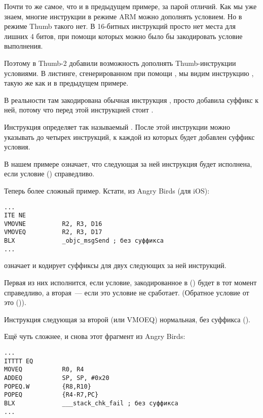 Почти то же самое, что и в предыдущем примере, за парой отличий.
Как мы уже знаем, многие инструкции в режиме ARM можно дополнять условием.
Но в режиме Thumb такого нет.
В 16-битных инструкций просто нет места для лишних 4 битов, при помощи
которых можно было бы закодировать условие выполнения.

Поэтому в Thumb-2 добавили возможность дополнять Thumb-инструкции условиями.
В листинге, сгенерированном при помощи \IDA, мы видим инструкцию , 
такую же как и в предыдущем примере.

В реальности там закодирована обычная инструкция , просто \IDA добавила суффикс  к ней, 
потому что перед этой инструкцией стоит .

\label{ARM_Thumb_IT}
Инструкция  определяет так называемый . 
После этой инструкции можно указывать до четырех инструкций, 
к каждой из которых будет добавлен суффикс условия.

В нашем примере  означает,
что следующая за ней инструкция будет исполнена, если условие
 () справедливо.

Теперь более сложный пример. Кстати, из 
Angry Birds (для iOS):

\begin{lstlisting}[caption=Angry Birds Classic]
...
ITE NE
VMOVNE          R2, R3, D16
VMOVEQ          R2, R3, D17
BLX             _objc_msgSend ; без суффикса
...
\end{lstlisting}

 означает  
и кодирует суффиксы для двух следующих за ней инструкций.

Первая из них исполнится, если условие, закодированное в  () будет в тот момент справедливо,
а вторая~--- если это условие не сработает.
(Обратное условие от  это  ()).

Инструкция следующая за второй  (или VMOEQ) нормальная, без суффикса ().

Ещё чуть сложнее, и снова этот фрагмент из Angry Birds:

\begin{lstlisting}[caption=Angry Birds Classic]
...
ITTTT EQ
MOVEQ           R0, R4
ADDEQ           SP, SP, #0x20
POPEQ.W         {R8,R10}
POPEQ           {R4-R7,PC}
BLX             ___stack_chk_fail ; без суффикса
...
\end{lstlisting}

